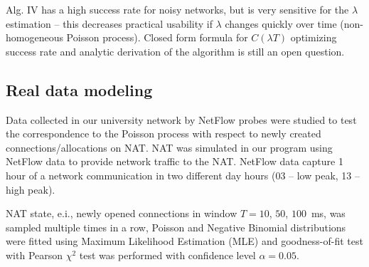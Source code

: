 \documentclass{acm_proc_article-sp}
\begin{document}
Alg. IV has a high success rate for 
noisy networks, but is very sensitive for the $\lambda$ estimation -- this decreases practical usability 
if $\lambda$ changes quickly over time (non-homogeneous Poisson process). Closed form formula for $C(\lambda T)$ 
optimizing success rate and analytic derivation of the algorithm is still an open question. 


\subsection{Real data modeling}
Data collected in our university network by NetFlow probes were studied to test the correspondence to the Poisson process
with respect to newly created connections/allocations on NAT. NAT was simulated in our program using
NetFlow data to provide network traffic to the NAT. NetFlow data capture 1 hour of a network communication in two different
day hours (03 -- low peak, 13 -- high peak).

NAT state, e.i., newly opened connections in window $T=10$, $50$, $100$~ms,
was sampled multiple times in a row, Poisson and Negative Binomial distributions were fitted using Maximum Likelihood Estimation (MLE)
and goodness-of-fit test with Pearson $\chi^2$ test was performed with confidence level $\alpha=0.05$.
\end{document}
